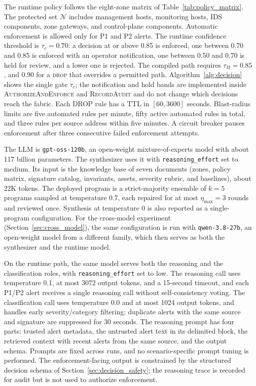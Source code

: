 \documentclass[final,5p]{elsarticle}
\begin{document}
The runtime policy follows the eight-zone matrix of Table~\ref{tab:policy_matrix}. The protected set $\mathcal{N}$ includes management hosts, monitoring hosts, IDS components, zone gateways, and control-plane components. Automatic enforcement is allowed only for P1 and P2 alerts. The runtime confidence threshold is $\tau_c=0.70$: a decision at or above 0.85 is enforced, one between 0.70 and 0.85 is enforced with an operator notification, one between 0.50 and 0.70 is held for review, and a lower one is rejected. The compiled path requires $\tau_\Pi=0.85$, and 0.90 for a \textsc{drop} that overrides a permitted path. Algorithm~\ref{alg:decision} shows the single gate $\tau_c$; the notification and hold bands are implemented inside \textsc{AuthorizeAndEnforce} and \textsc{RecordAudit} and do not change which decisions reach the fabric. Each DROP rule has a TTL in $[60,3600]$ seconds. Blast-radius limits are five automated rules per minute, fifty active automated rules in total, and three rules per source address within five minutes. A circuit breaker pauses enforcement after three consecutive failed enforcement attempts.

The LLM is \texttt{gpt-oss-120b}, an open-weight mixture-of-experts model with about 117 billion parameters. The synthesizer uses it with \texttt{reasoning\_effort} set to medium. Its input is the knowledge base of seven documents (zones, policy matrix, signature catalog, invariants, assets, severity rubric, and baselines), about 22K tokens. The deployed program is a strict-majority ensemble of $k=5$ programs sampled at temperature 0.7, each repaired for at most $\eta_{\max}=3$ rounds and reviewed once. Synthesis at temperature 0 is also reported as a single-program configuration. For the cross-model experiment (Section~\ref{sec:cross_model}), the same configuration is run with \texttt{qwen-3.8-27b}, an open-weight model from a different family, which then serves as both the synthesizer and the runtime model.

On the runtime path, the same model serves both the reasoning and the classification roles, with \texttt{reasoning\_effort} set to low. The reasoning call uses temperature 0.1, at most 3072 output tokens, and a 15-second timeout, and each P1/P2 alert receives a single reasoning call without self-consistency voting. The classification call uses temperature 0.0 and at most 1024 output tokens, and handles early severity/category filtering; duplicate alerts with the same source and signature are suppressed for 30 seconds. The reasoning prompt has four parts: trusted alert metadata, the untrusted alert text in its delimited block, the retrieved context with recent alerts from the same source, and the output schema. Prompts are fixed across runs, and no scenario-specific prompt tuning is performed. The enforcement-facing output is constrained by the structured decision schema of Section~\ref{sec:decision_safety}; the reasoning trace is recorded for audit but is not used to authorize enforcement.
\end{document}
